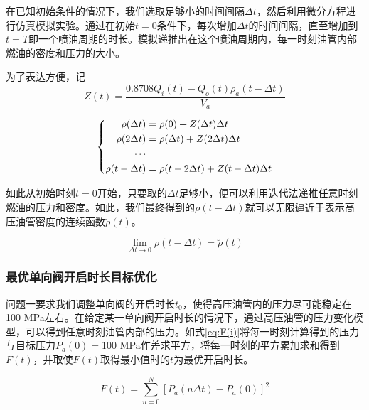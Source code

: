 \documentclass[withoutpreface,bwprint]{cumcmthesis} %
\begin{document}
在已知初始条件的情况下，我们选取足够小的时间间隔$\Delta t$，然后利用微分方程进行仿真模拟实验。通过在初始$t=0$条件下，每次增加$\Delta t$的时间间隔，直至增加到$t=T$即一个喷油周期的时长。模拟递推出在这个喷油周期内，每一时刻油管内部燃油的密度和压力的大小。

为了表达方便，记
\begin{equation}
Z(t)=\frac{0.8708Q_i(t) -Q_o(t)\rho_{a}(t-\Delta t)}{V_{a}}		
\end{equation}

\begin{equation}\notag
\left\{
\begin{align}
\rho(\Delta t) &= \rho(0)+Z(\Delta t)\Delta t \\
\rho(2 \Delta t) &=\rho(\Delta t)+Z(2 \Delta t)\Delta t \\
\cdots & \\
\rho(t-\Delta t) & = \rho(t-2\Delta t)+Z(t-\Delta t)\Delta t
\end{align}
\right.
\end{equation}

如此从初始时刻$t=0$开始，只要取的$\Delta t$足够小，便可以利用迭代法递推任意时刻燃油的压力和密度。如此，我们最终得到的$\rho(t-\Delta t)$就可以无限逼近于表示高压油管密度的连续函数$\breve{\rho} (t)$。

\begin{equation*}
\lim\limits_{\Delta t \rightarrow 0} \rho(t-\Delta t)=\breve{\rho}(t)
\end{equation*}

\subsubsection{最优单向阀开启时长目标优化}

问题一要求我们调整单向阀的开启时长$t_0$，使得高压油管内的压力尽可能稳定在100 MPa左右。在给定某一单向阀开启时长的情况下，通过高压油管的压力变化模型，可以得到任意时刻油管内部的压力。如式\cref{eq:F(i)}将每一时刻计算得到的压力与目标压力$P_a(0)=$100 MPa作差求平方，将每一时刻的平方累加求和得到$F(t)$，并取使$F(t)$取得最小值时的$t$为最优开启时长。

\begin{equation} \label{eq:F(i)}
F(t)=\sum_{n=0}^N[P_a(n\Delta t)-P_a(0)]^2
\end{equation}
\end{document}
